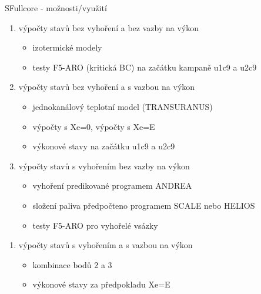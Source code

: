 \documentclass{beamer}
\begin{document}
\begin{frame}{SFullcore - možnosti/využití}

\begin{block}{}
	\begin{enumerate}\footnotesize
		\item výpočty stavů bez vyhoření a bez vazby na výkon
		\begin{itemize}\scriptsize
			\item izotermické modely
			\item testy F5-ARO (kritická BC) na začátku kampaně u1c9 a u2c9
		\end{itemize}
		\item výpočty stavů bez vyhoření a s vazbou na výkon
		\begin{itemize}\scriptsize
			\item jednokanálový teplotní model (TRANSURANUS)
			\item výpočty s Xe=0, výpočty s Xe=E
			\item výkonové stavy na začátku u1c9 a u2c9
		\end{itemize}
		\item výpočty stavů s vyhořením bez vazby na výkon
		\begin{itemize}\scriptsize
			\item vyhoření predikované programem ANDREA
			\item složení paliva předpočteno programem SCALE nebo HELIOS
			\item testy F5-ARO pro vyhořelé vsázky
	 	\end{itemize}

	\end{enumerate}
\end{block}

\begin{exampleblock}{}
		\begin{enumerate}\footnotesize
		\setcounter{enumi}{3}
		\item výpočty stavů s vyhořením a s vazbou na výkon
			\begin{itemize}\scriptsize
				\item kombinace bodů 2 a 3
				\item výkonové stavy za předpokladu Xe=E
			\end{itemize}
	  	\end{enumerate}
\end{exampleblock}

\end{frame}
\end{document}
